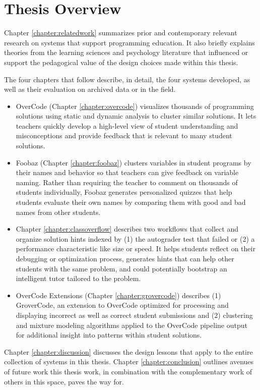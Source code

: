 \section{Thesis Overview}

Chapter \ref{chapter:relatedwork} summarizes prior and contemporary relevant research on systems that support programming education. It also briefly explains theories from the learning sciences and psychology literature that influenced or support the pedagogical value of the design choices made within this thesis.

The four chapters that follow describe, in detail, the four systems developed, as well as their evaluation on archived data or in the field.

\begin{itemize}
\item OverCode (Chapter \ref{chapter:overcode}) visualizes thousands of programming solutions using static and dynamic analysis to cluster similar solutions. It lets teachers quickly develop a high-level view of student understanding and misconceptions and provide feedback that is relevant to many student solutions. 

\item Foobaz (Chapter \ref{chapter:foobaz}) clusters variables in student programs by their names and behavior so that teachers can give feedback on variable naming. Rather than requiring the teacher to comment on thousands of students individually, Foobaz generates personalized quizzes that help students evaluate their own names by comparing them with good and bad names from other students. 

\item Chapter \ref{chapter:classoverflow} describes two workflows that collect and organize solution hints indexed by (1) the autograder test that failed or (2) a performance characteristic like size or speed. It helps students reflect on their debugging or optimization process, generates hints that can help other students with the same problem, and could potentially bootstrap an intelligent tutor tailored to the problem.

\item OverCode Extensions (Chapter \ref{chapter:grovercode}) describes (1) GroverCode, an extension to OverCode optimized for processing and displaying incorrect as well as correct student submissions and (2) clustering and mixture modeling algorithms applied to the OverCode pipeline output for additional insight into patterns within student solutions. 
\end{itemize}

Chapter \ref{chapter:discussion} discusses the design lessons that apply to the entire collection of systems in this thesis. Chapter \ref{chapter:conclusion} outlines avenues of future work this thesis work, in combination with the complementary work of others in this space, paves the way for.